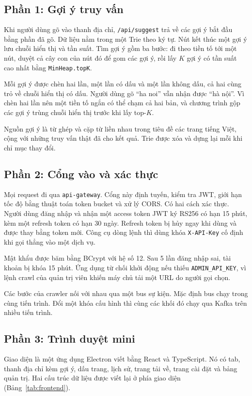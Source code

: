 \documentclass[9pt,twocolumn,a4paper]{extarticle}
\newcommand{\code}[1]{\texttt{#1}}
\begin{document}
\subsection{Phần 1: Gợi ý truy vấn}
\label{sec:suggest}
Khi người dùng gõ vào thanh địa chỉ, \code{/api/suggest} trả về các gợi ý bắt đầu bằng phần đã gõ. Dữ liệu nằm trong một Trie theo ký tự. Nút kết thúc một gợi ý lưu chuỗi hiển thị và tần suất. Tìm gợi ý gồm ba bước: đi theo tiền tố tới một nút, duyệt cả cây con của nút đó để gom các gợi ý, rồi lấy $K$ gợi ý có tần suất cao nhất bằng \code{MinHeap.topK}.

Mỗi gợi ý được chèn hai lần, một lần có dấu và một lần không dấu, cả hai cùng trỏ về chuỗi hiển thị có dấu. Người dùng gõ ``ha noi'' vẫn nhận được ``hà nội''. Vì chèn hai lần nên một tiền tố ngắn có thể chạm cả hai bản, và chương trình gộp các gợi ý trùng chuỗi hiển thị trước khi lấy top-$K$.

Nguồn gợi ý là từ ghép và cặp từ liền nhau trong tiêu đề các trang tiếng Việt, cộng với những truy vấn thật đã cho kết quả. Trie được xóa và dựng lại mỗi khi chỉ mục thay đổi.

\subsection{Phần 2: Cổng vào và xác thực}
Mọi request đi qua \code{api-gateway}. Cổng này định tuyến, kiểm tra JWT, giới hạn tốc độ bằng thuật toán token bucket và xử lý CORS. Có hai cách xác thực. Người dùng đăng nhập và nhận một access token JWT ký RS256 có hạn 15 phút, kèm một refresh token có hạn 30 ngày. Refresh token bị hủy ngay khi dùng và được thay bằng token mới. Công cụ dòng lệnh thì dùng khóa \code{X-API-Key} cố định khi gọi thẳng vào một dịch vụ.

Mật khẩu được băm bằng BCrypt với hệ số 12. Sau 5 lần đăng nhập sai, tài khoản bị khóa 15 phút. Ứng dụng từ chối khởi động nếu thiếu \code{ADMIN\_API\_KEY}, vì lệnh crawl của quản trị viên khiến máy chủ tải một URL do người gọi chọn.

Các bước của crawler nối với nhau qua một bus sự kiện. Mặc định bus chạy trong cùng tiến trình. Đổi một khóa cấu hình thì cùng các khối đó chạy qua Kafka trên nhiều tiến trình.

\subsection{Phần 3: Trình duyệt mini}
Giao diện là một ứng dụng Electron viết bằng React và TypeScript. Nó có tab, thanh địa chỉ kèm gợi ý, dấu trang, lịch sử, trang tải về, trang cài đặt và bảng quản trị. Hai cấu trúc dữ liệu được viết lại ở phía giao diện (Bảng~\ref{tab:frontend}).
\end{document}
